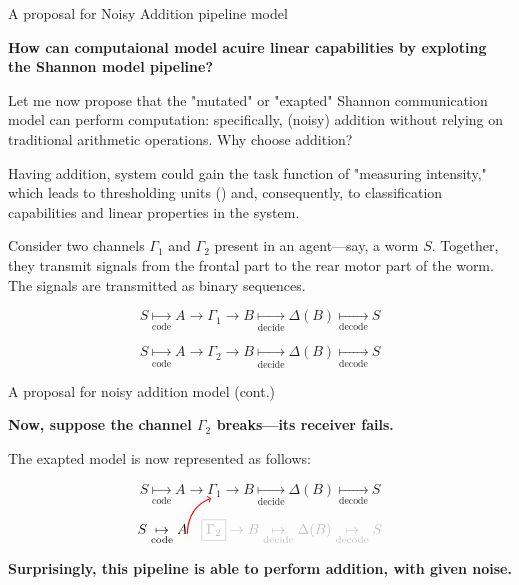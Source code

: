 \documentclass[10pt, aspectratio=169, handout]{beamer}
\begin{document}
\begin{frame}{A proposal for Noisy Addition pipeline model }
   
\textbf{How can computaional model acuire linear capabilities by exploting the Shannon model pipeline?}
    
Let me now propose that the "mutated" or "exapted" Shannon communication model  can perform computation: specifically, (noisy) addition without relying on traditional arithmetic operations. Why choose addition? 

Having addition, system could gain the task function of "measuring intensity," which leads to thresholding units (\cite{mcculloch_logical_1943}) and, consequently, to classification capabilities and linear properties in the system.

Consider two channels \(\Gamma_1\) and \(\Gamma_2\) present in an agent—say, a worm \(S\). Together, they transmit signals from the frontal part to the rear motor part of the worm. The signals are transmitted as binary sequences.


\[
S \underset{\text{code}}{\mapsto} A \rightarrow \boxed{\Gamma_1} \rightarrow B \underset{\text{decide}}{\mapsto} \Delta(B) \underset{\text{decode}}{\mapsto} S
\]

\[
S \underset{\text{code}}{\mapsto} A \rightarrow \boxed{\Gamma_2} \rightarrow B \underset{\text{decide}}{\mapsto} \Delta(B) \underset{\text{decode}}{\mapsto} S
\]

\end{frame}

\begin{frame}{A proposal for noisy addition model (cont.) }

\textbf{Now, suppose the channel \(\Gamma_2\) breaks—its receiver fails.} 

The exapted model is now represented as follows:

\[
S \underset{\text{code}}{\mapsto} A \rightarrow \boxed{\Gamma_1} \rightarrow B \underset{\text{decide}}{\mapsto} \Delta(B) \underset{\text{decode}}{\mapsto} S
\]

\[
S \underset{\text{code}}{\mapsto} 
A 
\begin{tikzpicture}[overlay, remember picture]
    \draw[->, red, thick] (0,0) to[out=90,in=200] (0.6,0.9);
\end{tikzpicture}
\textcolor{white}{\rightarrow }
\textcolor{lightgray}{\boxed{\Gamma_2} \rightarrow B \underset{\text{decide}}{\mapsto} \Delta(B) \underset{\text{decode}}{\mapsto} S}
\]

\textbf{Surprisingly, this pipeline is able to perform addition, with given noise. }

\end{frame}
\end{document}
